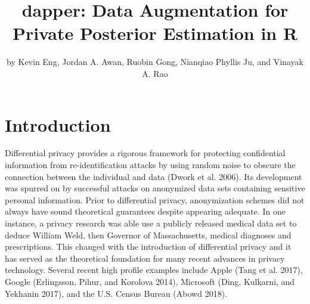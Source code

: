\title{dapper: Data Augmentation for Private Posterior Estimation in R}


\author{by Kevin Eng, Jordan A. Awan, Ruobin Gong, Nianqiao Phyllis Ju, and Vinayak A. Rao}

\maketitle


\hypertarget{introduction}{%
\section{Introduction}\label{introduction}}

Differential privacy provides a rigorous framework for protecting
confidential information from re-identification attacks by using random
noise to obscure the connection between the individual and data (Dwork et al. 2006).
Its development was spurred on by successful attacks
on anonymized data sets containing sensitive personal information. Prior
to differential privacy, anonymization schemes did not always have sound
theoretical guarantees despite appearing adequate. In one instance,
a privacy research was able use a publicly released medical data set
to deduce William Weld, then Governor of Massachusetts, medical diagnoses and prescriptions.
This changed with the introduction of differential privacy and it has served as the theoretical foundation
for many recent advances in privacy technology. Several recent high profile
examples include Apple (Tang et al. 2017), Google (Erlingsson, Pihur, and Korolova 2014), Microsoft (Ding, Kulkarni, and Yekhanin 2017), and the
U.S. Census Bureau (Abowd 2018).


